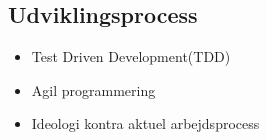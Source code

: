 \subsection{Udviklingsprocess}
\begin{frame}
  \begin{itemize}
    \item Test Driven Development(TDD)
    \item Agil programmering
    \item Ideologi kontra aktuel arbejdsprocess
  \end{itemize}
\end{frame}